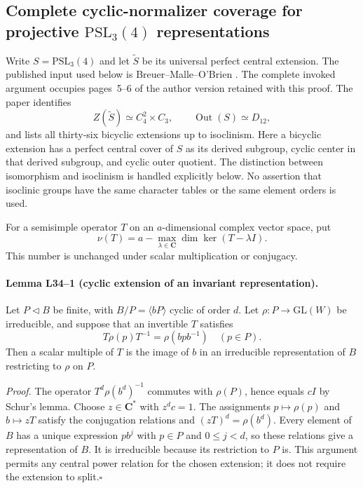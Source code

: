 \subsection{Complete cyclic-normalizer coverage for projective
\texorpdfstring{$\mathrm{PSL}_3(4)$}{PSL3(4)} representations}
\label{sec:l34-normalizer-coverage}

Write $S=\mathrm{PSL}_3(4)$ and let $\widetilde S$ be its universal
perfect central extension.  The published input used below is
Breuer--Malle--O'Brien \cite[\S3.3.1 and Lemma~3.1]{D:BMO2017}.
The complete invoked argument occupies pages~5--6 of the author version
retained with this proof.  The paper identifies
\[
 Z(\widetilde S)\simeq C_4^2\times C_3,
 \qquad \operatorname{Out}(S)\simeq D_{12},
\]
and lists all thirty-six bicyclic extensions up to isoclinism.
Here a bicyclic extension has a perfect central cover of $S$ as its
derived subgroup, cyclic center in that derived subgroup, and cyclic
outer quotient.  The distinction between isomorphism and isoclinism is
handled explicitly below.  No assertion that isoclinic groups have the
same character tables or the same element orders is used.

For a semisimple operator $T$ on an $a$-dimensional complex vector space,
put
\[
 \nu(T)=a-\max_{\lambda\in\mathbf C}
                  \dim\ker(T-\lambda I).
\]
This number is unchanged under scalar multiplication or conjugacy.

\paragraph{Lemma L34--1 (cyclic extension of an invariant representation).}
Let $P\lhd B$ be finite, with $B/P=\langle bP\rangle$ cyclic of
order $d$.  Let $\rho:P\to\mathrm{GL}(W)$ be irreducible, and suppose
that an invertible $T$ satisfies
\[
 T\rho(p)T^{-1}=\rho(bpb^{-1})\quad(p\in P).
\]
Then a scalar multiple of $T$ is the image of $b$ in an irreducible
representation of $B$ restricting to $\rho$ on $P$.

\emph{Proof.}
The operator $T^d\rho(b^d)^{-1}$ commutes with $\rho(P)$, hence equals
$cI$ by Schur's lemma.  Choose $z\in\mathbf C^*$ with $z^dc=1$.
The assignments $p\mapsto\rho(p)$ and $b\mapsto zT$ satisfy the
conjugation relations and $(zT)^d=\rho(b^d)$.
Every element of $B$ has a unique expression $pb^j$ with
$p\in P$ and $0\leq j<d$, so these relations give a representation
of $B$.  It is irreducible because its restriction to $P$ is.
This argument permits any central power relation for the chosen
extension; it does not require the extension to split.\hfill$\square$

